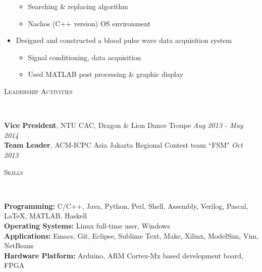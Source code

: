 \documentclass[a4paper, 12pt]{article}
\newenvironment{changemargin}[2]{%
  \begin{list}{}{%
      \setlength{\topsep}{0pt}%
      \setlength{\leftmargin}{#1}%
      \setlength{\rightmargin}{#2}%
      \setlength{\listparindent}{\parindent}%
      \setlength{\itemindent}{\parindent}%
      \setlength{\parsep}{\parskip}%
    }%
  \item[]}{\end{list}
}
\newcommand{\lineover}{
  \begin{changemargin}{-0.05in}{-0.05in}
    \vspace*{-8pt}
    \hrulefill \\
    \vspace*{-2pt}
  \end{changemargin}
}
\newcommand{\header}[1]{
  \begin{changemargin}{-0.5in}{-0.5in}
    \scshape{#1}\\
    \lineover
  \end{changemargin}
}
\newenvironment{body}
{
\vspace*{-16pt}
\begin{changemargin}{-0.25in}{-0.5in}
}	
{
\end{changemargin}
}
\begin{document}
\begin{body}
\begin{itemize}
    \begin{itemize} \itemsep -0pt \small
        \item Searching \& replacing algorithm
        \item Nachos (C++ version) OS environment
    \end{itemize}
  \item Designed and constructed a blood pulse wave data acquisition system
    \begin{itemize} \itemsep -0pt \small
        \item Signal conditioning, data acquisition
        \item Used MATLAB post processing \& graphic display
    \end{itemize}
  \end{itemize}
\end{body}


\smallskip
\medskip
\header{Leadership Activities}
\begin{body}
  \vspace{14pt}
  \textbf{Vice President}, NTU CAC, Dragon \& Lion Dance Troupe \hfill {} \emph{Aug 2013 - May 2014}\\
  \smallskip
  \textbf{Team Leader}, ACM-ICPC Asia Jakarta Regional Contest team ``FSM" \hfill {} \emph{Oct 2013}\\
\end{body}

%
%

\smallskip
\medskip
\header{Skills}
\begin{body}
  \vspace{14pt}
  \textbf{Programming:}{} C/C++, Java, Python, Perl, Shell, Assembly, Verilog, Pascal, \LaTeX, MATLAB, Haskell\\
  \medskip
  \textbf{Operating Systems:}{} Linux full-time user, Windows\\
  \medskip
  \textbf{Applications:}{} Emacs, Git, Eclipse, Sublime Text, Make, Xilinx, ModelSim, Vim, NetBeans\\
  \medskip
  \textbf{Hardware Platform:}{} Arduino, ARM Cortex-Mx based development board, FPGA\\
\end{body}
\end{document}
